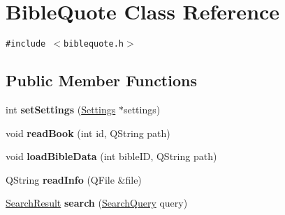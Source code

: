 \hypertarget{classBibleQuote}{
\section{BibleQuote Class Reference}
\label{classBibleQuote}
}
{\tt \#include $<$biblequote.h$>$}

\subsection*{Public Member Functions}
\begin{CompactItemize}
\item 
\hypertarget{classBibleQuote_3d20c298cc87364e6fb9abc67352dfb9}{
int \textbf{setSettings} (\hyperlink{classSettings}{Settings} $\ast$settings)}
\label{classBibleQuote_3d20c298cc87364e6fb9abc67352dfb9}

\item 
\hypertarget{classBibleQuote_58aedb76c7e070278619dc214bef5f7c}{
void \textbf{readBook} (int id, QString path)}
\label{classBibleQuote_58aedb76c7e070278619dc214bef5f7c}

\item 
\hypertarget{classBibleQuote_0f9c1eb1346380d3f8e21c9cdf76390d}{
void \textbf{loadBibleData} (int bibleID, QString path)}
\label{classBibleQuote_0f9c1eb1346380d3f8e21c9cdf76390d}

\item 
\hypertarget{classBibleQuote_f4bd0be7d2ebf2b3fddc60757acf556a}{
QString \textbf{readInfo} (QFile \&file)}
\label{classBibleQuote_f4bd0be7d2ebf2b3fddc60757acf556a}

\item 
\hypertarget{classBibleQuote_b87214e63ac373631c5867e6d58cd69c}{
\hyperlink{classSearchResult}{SearchResult} \textbf{search} (\hyperlink{classSearchQuery}{SearchQuery} query)}
\label{classBibleQuote_b87214e63ac373631c5867e6d58cd69c}

\end{CompactItemize}
